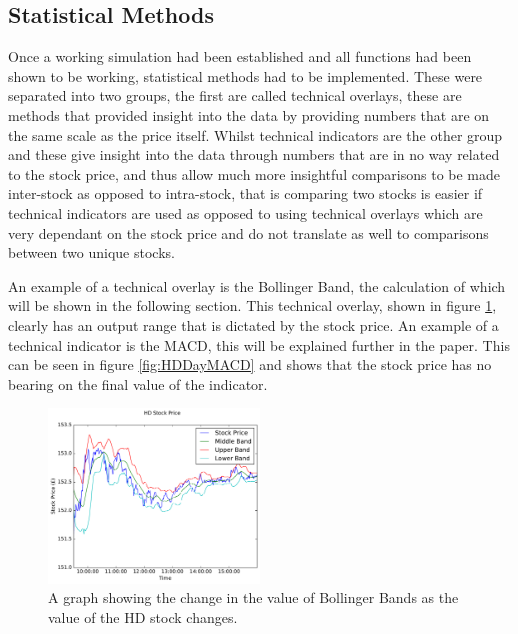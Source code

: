 \documentclass[conference]{IEEEtran}
\begin{document}

\subsection{Statistical Methods}

Once a working simulation had been established and all functions had been shown to be working, statistical methods had to be implemented. These were separated into two groups, the first are called technical overlays, these are methods that provided insight into the data by providing numbers that are on the same scale as the price itself. Whilst technical indicators are the other group and these give insight into the data through numbers that are in no way related to the stock price, and thus allow much more insightful comparisons to be made inter-stock as opposed to intra-stock, that is comparing two stocks is easier if technical indicators are used as opposed to using technical overlays which are very dependant on the stock price and do not translate as well to comparisons between two unique stocks. 

An example of a technical overlay is the Bollinger Band, the calculation of which will be shown in the following section. This technical overlay, shown in figure \ref{fig:HDDayBollinger}, clearly has an output range that is dictated by the stock price. An example of a technical indicator is the MACD, this will be explained further in the paper. This can be seen in figure \ref{fig:HDDayMACD} and shows that the stock price has no bearing on the final value of the indicator.

\begin{figure}
\includegraphics[width=0.5\textwidth, angle=0]{HDDayBollinger.pdf}
\caption{A graph showing the change in the value of Bollinger Bands as the value of the HD stock changes.}
\label{fig:HDDayBollinger}
\end{figure}
\end{document}
